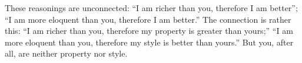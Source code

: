 These reasonings are unconnected: ``I am richer than you, therefore
I am better''; ``I am more eloquent than you, therefore I am better.''
The connection is rather this: ``I am richer than you, therefore my
property is greater than yours;'' ``I am more eloquent than you, therefore
my style is better than yours.'' But you, after all, are neither property
nor style. 
